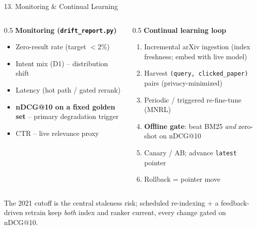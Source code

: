 \documentclass[10pt,aspectratio=169]{beamer}
\begin{document}
\begin{frame}{13. Monitoring \& Continual Learning}
\begin{columns}[T]
\begin{column}{0.5\textwidth}
\textbf{Monitoring (\texttt{drift\_report.py})}
\begin{itemize}\small
  \item Zero-result rate (target $<2\%$)
  \item Intent mix (D1) -- distribution shift
  \item Latency (hot path / gated rerank)
  \item \textbf{nDCG@10 on a fixed golden set} -- primary degradation trigger
  \item CTR -- live relevance proxy
\end{itemize}
\end{column}
\begin{column}{0.5\textwidth}
\textbf{Continual learning loop}
\begin{enumerate}\small
  \item Incremental arXiv ingestion (index freshness; embed with live model)
  \item Harvest \texttt{(query, clicked\_paper)} pairs (privacy-minimized)
  \item Periodic / triggered re-fine-tune (MNRL)
  \item \textbf{Offline gate}: beat BM25 \emph{and} zero-shot on nDCG@10
  \item Canary / AB; advance \texttt{latest} pointer
  \item Rollback = pointer move
\end{enumerate}
\end{column}
\end{columns}

\vspace{0.15cm}
\centering
\scriptsize The 2021 cutoff is the central staleness risk; scheduled re-indexing + a feedback-driven retrain keep \emph{both} index and ranker current, every change gated on nDCG@10.
\end{frame}
\end{document}
